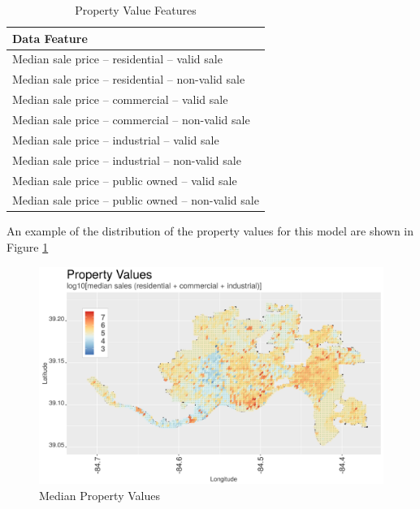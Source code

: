 \documentclass{llncs}
\begin{document}

\FloatBarrier
\begin{table}[!h]
\begin{center}
\caption{Property Value Features}
\label{table : propertyValueFeatures}
\begin{tabular}{ p{}}
\hline
\rule{0pt}{12pt}
Data Feature	\\
\hline
Median sale price – residential – valid sale\\
Median sale price – residential – non-valid sale\\
Median sale price – commercial – valid sale\\
Median sale price – commercial – non-valid sale\\
Median sale price – industrial – valid sale\\
Median sale price – industrial – non-valid sale\\
Median sale price – public owned – valid sale\\
Median sale price – public owned – non-valid sale \\[2pt]
\hline
\end{tabular}
\end{center}
\end{table}
\FloatBarrier
%

An example of the distribution of the property values for this model are shown in Figure \ref{figure : medianpropertyvalues}

\FloatBarrier
\begin{figure}
 	\includegraphics[width=\textwidth, height=\textheight, keepaspectratio]{propertyValuesMedianAllY}
 	\caption{Median Property Values}
	\label{figure : medianpropertyvalues}
\end{figure}
\FloatBarrier
\end{document}
